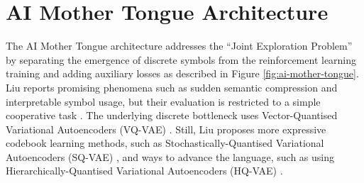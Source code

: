 



\section{AI Mother Tongue Architecture}
\label{sec:2.4}

The AI Mother Tongue architecture addresses the ``Joint Exploration Problem'' by separating the emergence of discrete symbols from the reinforcement learning training and adding auxiliary losses as described in Figure \ref{fig:ai-mother-tongue}.
Liu reports promising phenomena such as sudden semantic compression and interpretable symbol usage, but their evaluation is restricted to a simple cooperative task \cite{AIMotherTongue}.
The underlying discrete bottleneck uses Vector-Quantised Variational Autoencoders (VQ-VAE) \cite{VQVAE}.
Still, Liu proposes more expressive codebook learning methods, such as Stochastically-Quantised Variational Autoencoders (SQ-VAE) \cite{SQVAE}, and ways to advance the language, such as using Hierarchically-Quantised Variational Autoencoders (HQ-VAE) \cite{HQVAE}.

